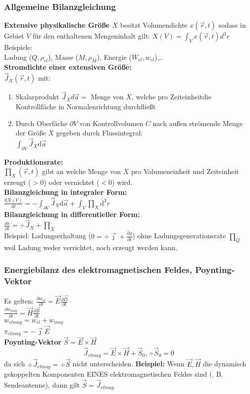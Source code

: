 \documentclass[english]{latex4ei/latex4ei_sheet}
\begin{document}
\subsubsection{Allgemeine Bilanzgleichung}
\textbf{Extensive physikalische Gr\"o\ss{}e $X$} besitzt Volumendichte $x(\vec{r},t)$ sodass in Gebiet $V$ f\"ur den enthaltenen Mengeninhalt gilt: $X(V)=\int_V x(\vec{r},t) d^3 r$\\
Beispiele:\\
Ladung ($Q,\rho_{el}$), Masse ($M, \rho_M$), Energie ($W_{el},w_{el}$),..\\
\textbf{Stromdichte einer extensiven Gr\"o\ss{}e:}\\
$\vec{J}_X (\vec{r},t)$ mit:
\begin{enumerate}
	\item Skalarprodukt $\vec{J}_X d \vec{a}=$ Menge von $X$, welche pro Zeiteinheitdie Kontrollf\"ache in Normalenrichtung durchflie\ss{}t
	\item Durch Oberf\"ache $\partial V$ von Kontrollvolumen $C$ nach au\ss{}en str\"omende Menge der Gr\"o\ss{}e $X$ gegeben durch Flussintegral:\\
		$\int_{\partial V} \vec{J}_X \mathrm{d} \vec{a}$
\end{enumerate}
\textbf{Produktionsrate:}\\
$\prod_X (\vec{r},t)$ gibt an welche Menge von $X$ pro Volumeneinheit und Zeiteinheit erzeugt ($>0$) oder vernichtet ($<0$) wird.\\
\textbf{Bilanzgleichung in integraler Form:}\\
$\frac{\mathrm{d} X(V)}{\mathrm{d} t}=-\int_{\partial V} \vec{J}_X \mathrm{d} \vec{a} + \int_V \prod_X \mathrm{d}^3 r$\\
\textbf{Bilanzgleichung in differentieller Form:}\\
$\frac{\partial x}{\partial t}=\div{\vec{J}_X}+\prod_X$\\
Beispiel: Ladungserhaltung ($0=\div{\vec{\jmath}}+\frac{\partial \rho}{\partial t}$) ohne Ladungsgenerationsrate $\prod_Q$ weil Ladung weder verrichtet, noch erzeugt werden kann.

\subsubsection{Energiebilanz des elektromagnetischen Feldes, Poynting-Vektor}

Es gelten:
$\frac{\partial w_{el}}{\partial t} = \vec{E} \frac{\partial \vec{D}}{\partial t}$\\
$\frac{\partial w_{mag}}{\partial t}= \vec{H} \frac{\partial \vec{B}}{\partial t}$\\
$w_{elmag}=w_{el}+w_{mag}$\\
$\pi_{elmag}=-\vec{\jmath} \vec{E}$\\
\textbf{Poynting-Vektor} $\vec{S}=\vec{E} \times \vec{H}$\\
\[\vec{J}_{elmag}=\vec{E} \times \vec{H} + \vec{S}_0, \div{\vec{S}_0}=0\]
da sich $\div{\vec{J}_{elmag}}=\div{\vec{S}}$ nicht unterscheiden.
\textbf{Beispiel:} Wenn $\vec{E},\vec{H}$ die dynamisch gekoppelten Komponenten EINES elektromagnetischen Feldes sind (. B. Sendeantenne), dann gilt $\vec{S}=\vec{J}_{elmag}$
\end{document}
